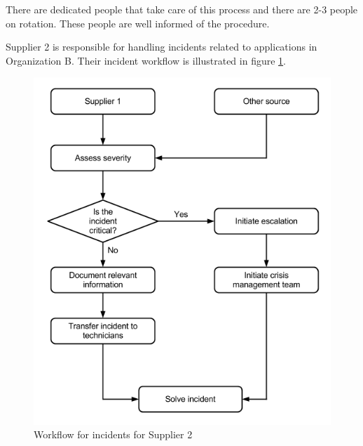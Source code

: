 There are dedicated people that take care of this process and there are 2-3 people on rotation. These people are well informed of the procedure.  


Supplier 2 is responsible for handling incidents related to applications in Organization B. Their incident workflow is illustrated in figure \ref{fig:WorkflowCaseBSupplier2}.

\begin{figure}[H]
\begin{center}
\includegraphics[scale=0.54]{WorkflowCaseBSupplier2.png}
\caption[Workflow for incidents, Case B Supplier 2]{Workflow for incidents for Supplier 2}
\label{fig:WorkflowCaseBSupplier2}
\end{center}
\end{figure}

